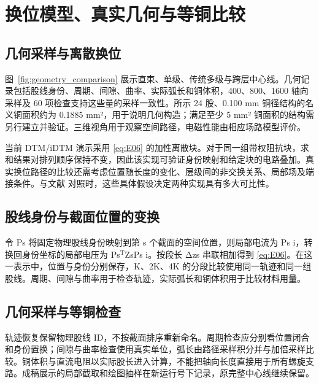 \section{换位模型、真实几何与等铜比较}
\label{chapter:05}

\hypertarget{05.geometry.heading}{}
\subsection{几何采样与离散换位}

\hypertarget{05.geometry.p1}{}
图~\ref{fig:geometry_comparison} 展示直束、单级、传统多级与跨层中心线。几何记录包括股线身份、周期、间隙、曲率、实际弧长和铜体积，400、800、1600 轴向采样及 60 项检查支持这些量的采样一致性。所示 24 股、0.100 mm 铜径结构的名义铜面积约为 0.1885 mm²，用于说明几何构造；满足至少 5 mm² 铜面积的结构需另行建立并验证。三维视角用于观察空间路径，电磁性能由相应场路模型评价。

\hypertarget{05.geometry.p2}{}
当前 DTM/iDTM 演示采用 \eqref{eq:E06} 的加性离散块。对于同一组带权阻抗块，求和结果对排列顺序保持不变，因此该实现可验证身份映射和给定块的电路叠加。真实换位路径的比较还需考虑位置随长度的变化、层级间的非交换关系、局部场及端接条件。与文献 \cite{P01,N01} 对照时，这些具体假设决定两种实现具有多大可比性。

\hypertarget{05.dtm_derivation.heading}{}
\subsection{股线身份与截面位置的变换}

\hypertarget{05.dtm_derivation.p1}{}
令 Ps 将固定物理股线身份映射到第 s 个截面的空间位置，则局部电流为 Ps i，转换回身份坐标的局部电压为 Ps\(^{\mathrm T}\)ZsPs i。按段长 Δzs 串联相加得到 \eqref{eq:E06}。在这一表示中，位置与身份分别保存，K、2K、4K 的分段比较使用同一轨迹和同一组股线。周期、间隙与曲率用于检查轨迹，实际弧长和铜体积用于比较材料用量。

\hypertarget{05.report_geometry.heading}{}
\subsection{几何采样与等铜检查}

\hypertarget{05.report_geometry.p1}{}
轨迹恢复保留物理股线 ID，不按截面排序重新命名。周期检查应分别看位置闭合和身份置换；间隙与曲率检查使用真实单位，弧长由路径采样积分并与加倍采样比较。铜体积与直流电阻以实际股长进入计算，不能把轴向长度直接用于所有螺旋支路。成稿展示的局部截取和绘图抽样在新运行号下记录，原完整中心线继续保留。

